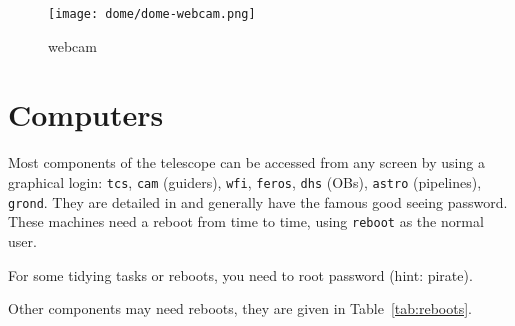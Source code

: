 \documentclass[11pt,fleqn,a4paper]{book}
\begin{document}
\begin{figure}[!ht]
\centering
  \texttt{[image: dome/dome-webcam.png]}%
\caption[Dome webcam]{\gls{webcam}}
\label{fig:webcam}
\end{figure}

\section{Computers}
Most components of the telescope can be accessed from any screen by using a graphical login: \texttt{tcs}, \texttt{cam} (guiders), \texttt{wfi}, \texttt{feros}, \texttt{dhs} (OBs), \texttt{astro} (pipelines), \texttt{grond}.  They are detailed in  and generally have the famous good seeing password. These machines need a reboot from time to time, using \texttt{reboot} as the normal user. 

For some tidying tasks or reboots, you need to root password (hint: pirate). 

Other components may need reboots, they are given in Table~\ref{tab:reboots}. 
\end{document}
